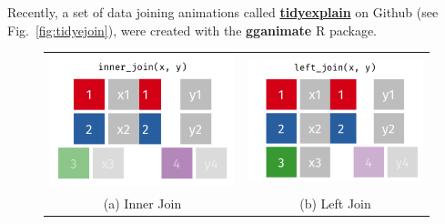 Recently, a set of data joining animations called \href{https://github.com/gadenbuie/tidyexplain}{\textbf{tidyexplain}} \citep{tidyexplain} on \textsf{Github} (see Fig.~\ref{fig:tidyejoin}), were created with the \textbf{gganimate} \citep{gganimate} \textsf{R} package.

\begin{figure}[H]
    \begin{tabular}{cc}
     \includegraphics[scale = 0.25]{Masters-Thesis/img/gginnerj.png} & \includegraphics[scale = 0.25]{Masters-Thesis/img/ggleftj.png} \\
    (a) Inner Join & (b) Left Join \\[6pt]

\end{tabular}
\end{figure}
